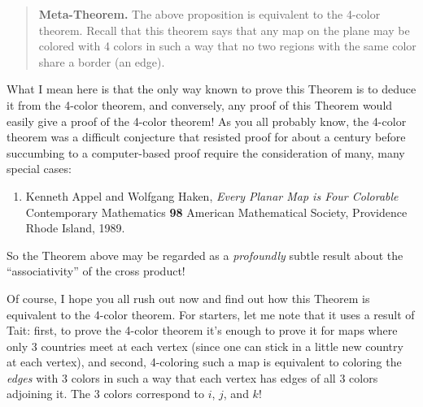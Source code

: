 \documentclass{article}
\begin{document}
\begin{quote}
{\rm 
\textbf{Meta-Theorem.} The above proposition is equivalent to the
4-color theorem. Recall that this theorem says that any map on the plane
may be colored with 4 colors in such a way that no two regions with the
same color share a border (an edge).
}
\end{quote}

What I mean here is that the only way known to prove this Theorem is to
deduce it from the 4-color theorem, and conversely, any proof of this
Theorem would easily give a proof of the 4-color theorem! As you all
probably know, the 4-color theorem was a difficult conjecture that
resisted proof for about a century before succumbing to a computer-based
proof require the consideration of many, many special cases:

\begin{enumerate}
\def\labelenumi{\arabic{enumi})}
\setcounter{enumi}{3}
\item
  Kenneth Appel and Wolfgang Haken, \emph{Every Planar Map is Four Colorable}
  Contemporary Mathematics \textbf{98} American Mathematical Society, Providence
  Rhode Island, 1989.
\end{enumerate}

So the Theorem above may be regarded as a \emph{profoundly} subtle
result about the ``associativity'' of the cross product!

Of course, I hope you all rush out now and find out how this Theorem is
equivalent to the 4-color theorem. For starters, let me note that it
uses a result of Tait: first, to prove the 4-color theorem it's enough
to prove it for maps where only 3 countries meet at each vertex (since
one can stick in a little new country at each vertex), and second,
4-coloring such a map is equivalent to coloring the \emph{edges} with 3
colors in such a way that each vertex has edges of all 3 colors
adjoining it. The 3 colors correspond to \(i\), \(j\), and \(k\)!
\end{document}
